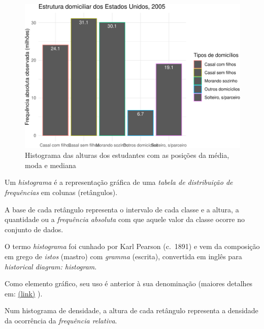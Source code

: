 \documentclass[
]{book}
\begin{document}
\begin{figure}

{\centering \includegraphics[width=0.8\linewidth]{apostila_files/figure-latex/unnamed-chunk-48-1} 

}

\caption{Histograma das alturas dos estudantes com as posições da média, moda e mediana}\label{fig:unnamed-chunk-48}
\end{figure}

\hfill\break

Um \emph{histograma} é a representação gráfica de uma \emph{tabela de distribuição de frequências} em colunas (retângulos).

\hfill\break

A base de cada retângulo representa o intervalo de cada classe e a altura, a quantidade ou a \emph{frequência absoluta} com que aquele valor da classe ocorre no conjunto de dados.

\hfill\break

O termo \emph{histograma} foi cunhado por Karl Pearson (c.~1891) e vem da composição em grego de \emph{istos} (mastro) com \emph{gramma} (escrita), convertida em inglês para \emph{historical diagram: histogram}.

\hfill\break

Como elemento gráfico, seu uso é anterior à sua denominação (maiores detalhes em:
\href{https://www.ine.es/ss/Satellite?blobcol=urldata\&blobheader=application\%2Fpdf\&blobheadername1=Content-Disposition\&blobheadervalue1=attachment\%3B+filename\%3Dart_192_2.pdf\&blobkey=urldata\&blobtable=MungoBlobs\&blobwhere=229\%2F670\%2Fart_192_2.pdf\&ssbinary=true}{(link)} ).

\hfill\break

Num histograma de densidade, a altura de cada retângulo representa a densidade da ocorrência da \emph{frequência relativa}.
\end{document}

